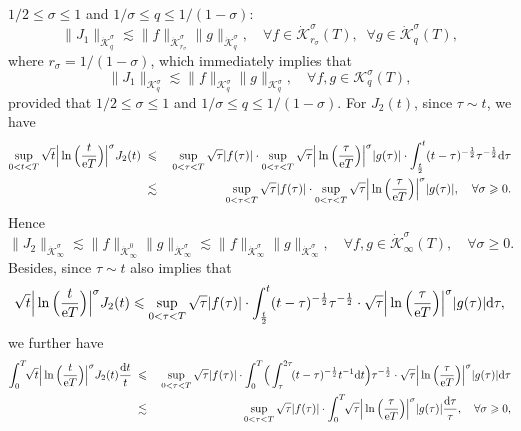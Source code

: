 \documentclass[11pt]{article}
\newcommand{\rmd}{\mbox{\rm d}}
\newcommand{\rme}{{\rm e}}
\begin{document}
  $1/2\leqslant\sigma\leqslant 1$ and $1/\sigma\leqslant q\leqslant 1/(1\!-\!\sigma)$:
$$
  \|J_1\|_{\dot{\mathscr{K}}^{\sigma}_q}\lesssim\|f\|_{\dot{\mathscr{K}}^{\sigma}_{r_{\sigma}}}\|g\|_{\dot{\mathscr{K}}^{\sigma}_q}, \quad
  \forall f\in\dot{\mathscr{K}}^{\sigma}_{r_{\sigma}}(T),\;\; \forall g\in\dot{\mathscr{K}}^{\sigma}_q(T),
$$
  where $r_{\sigma}=1/(1\!-\!\sigma)$, which immediately implies that
\begin{equation}
  \|J_1\|_{\mathscr{K}^{\sigma}_q}\lesssim\|f\|_{\mathscr{K}^{\sigma}_q}\|g\|_{\mathscr{K}^{\sigma}_q}, \quad
  \forall f,g\in\mathscr{K}^{\sigma}_q(T),
\end{equation}
  provided that $1/2\leqslant\sigma\leqslant 1$ and $1/\sigma\leqslant q\leqslant 1/(1\!-\!\sigma)$.  For $J_2(t)$, since $\tau\sim t$, we have
\begin{eqnarray*}
  \sup_{0<t<T}\sqrt{t}\Big|\ln\Big(\frac{t}{\rme T}\Big)\Big|^{\sigma}J_2(t)
  &\;\leqslant\;&\sup_{0<\tau<T}\sqrt{\tau}|f(\tau)|\cdot\sup_{0<\tau<T}\sqrt{\tau}\Big|\ln\Big(\frac{\tau}{\rme T}\Big)\Big|^{\sigma}|g(\tau)|\cdot
  \int_{\frac{t}{2}}^t(t-\tau)^{-\frac{1}{2}}\tau^{-\frac{1}{2}}\rmd\tau
\\
  &\;\lesssim\;&\sup_{0<\tau<T}\sqrt{\tau}|f(\tau)|\cdot\sup_{0<\tau<T}\sqrt{\tau}\Big|\ln\Big(\frac{\tau}{\rme T}\Big)\Big|^{\sigma}|g(\tau)|,
  \quad \forall\sigma\geqslant 0.
\end{eqnarray*}
  Hence
\begin{equation}
  \|J_2\|_{\dot{\mathscr{K}}^{\sigma}_{\infty}}\lesssim\|f\|_{\dot{\mathscr{K}}^{0}_{\infty}}\|g\|_{\dot{\mathscr{K}}^{\sigma}_{\infty}}
  \lesssim\|f\|_{\dot{\mathscr{K}}^{\sigma}_{\infty}}\|g\|_{\dot{\mathscr{K}}^{\sigma}_{\infty}},
  \quad \forall f,g\in\dot{\mathscr{K}}^{\sigma}_{\infty}(T), \quad \forall\sigma\geqslant 0.
\end{equation}
  Besides, since $\tau\sim t$ also implies that
$$
  \sqrt{t}\Big|\ln\Big(\frac{t}{\rme T}\Big)\Big|^{\sigma}J_2(t)\leqslant\sup_{0<\tau<T}\sqrt{\tau}|f(\tau)|\cdot
  \int_{\frac{t}{2}}^t(t-\tau)^{-\frac{1}{2}}\tau^{-\frac{1}{2}}\cdot\sqrt{\tau}\Big|\ln\Big(\frac{\tau}{\rme T}\Big)\Big|^{\sigma}|g(\tau)|\rmd\tau,
$$
  we further have
\begin{eqnarray*}
  \int_0^T\!\!\sqrt{t}\Big|\ln\Big(\frac{t}{\rme T}\Big)\Big|^{\sigma}J_2(t)\frac{\rmd t}{t}
  &\;\leqslant\;&\sup_{0<\tau<T}\sqrt{\tau}|f(\tau)|\cdot\int_0^T\!\Big(\int_{\tau}^{2\tau}\!(t-\tau)^{-\frac{1}{2}}t^{-1}\rmd t\Big)
  \tau^{-\frac{1}{2}}\cdot\sqrt{\tau}\Big|\ln\Big(\frac{\tau}{\rme T}\Big)\Big|^{\sigma}|g(\tau)|\rmd\tau
\\
  &\;\lesssim\;&\sup_{0<\tau<T}\sqrt{\tau}|f(\tau)|\cdot\int_0^T\!\!\sqrt{\tau}\Big|\ln\Big(\frac{\tau}{\rme T}\Big)\Big|^{\sigma}|g(\tau)|
  \frac{\rmd\tau}{\tau}, \quad \forall\sigma\geqslant 0,
\end{eqnarray*}
\end{document}
